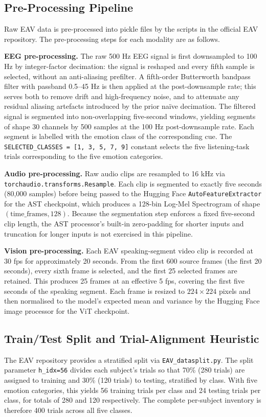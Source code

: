 \subsection{Pre-Processing Pipeline}
Raw EAV data is pre-processed into pickle files by the scripts in the official EAV repository. The pre-processing steps for each modality are as follows.

\textbf{EEG pre-processing.} The raw 500 Hz EEG signal is first downsampled to 100 Hz by integer-factor decimation: the signal is reshaped and every fifth sample is selected, without an anti-aliasing prefilter. A fifth-order Butterworth bandpass filter with passband 0.5--45 Hz is then applied at the post-downsample rate; this serves both to remove drift and high-frequency noise, and to attenuate any residual aliasing artefacts introduced by the prior naïve decimation. The filtered signal is segmented into non-overlapping five-second windows, yielding segments of shape 30 channels by 500 samples at the 100 Hz post-downsample rate. Each segment is labelled with the emotion class of the corresponding cue. The \texttt{SELECTED\_CLASSES = [1, 3, 5, 7, 9]} constant selects the five listening-task trials corresponding to the five emotion categories.

\textbf{Audio pre-processing.} Raw audio clips are resampled to 16 kHz via \texttt{torchaudio.transforms.Resample}. Each clip is segmented to exactly five seconds (80{,}000 samples) before being passed to the Hugging Face \texttt{AutoFeatureExtractor} for the AST checkpoint, which produces a 128-bin Log-Mel Spectrogram of shape $(\mathrm{time\_frames}, 128)$. Because the segmentation step enforces a fixed five-second clip length, the AST processor's built-in zero-padding for shorter inputs and truncation for longer inputs is not exercised in this pipeline.

\textbf{Vision pre-processing.} Each EAV speaking-segment video clip is recorded at 30 fps for approximately 20 seconds. From the first 600 source frames (the first 20 seconds), every sixth frame is selected, and the first 25 selected frames are retained. This produces 25 frames at an effective 5 fps, covering the first five seconds of the speaking segment. Each frame is resized to $224\times224$ pixels and then normalised to the model's expected mean and variance by the Hugging Face image processor for the ViT checkpoint.

\subsection{Train/Test Split and Trial-Alignment Heuristic}
The EAV repository provides a stratified split via \texttt{EAV\_datasplit.py}. The split parameter \texttt{h\_idx=56} divides each subject's trials so that 70\% (280 trials) are assigned to training and 30\% (120 trials) to testing, stratified by class. With five emotion categories, this yields 56 training trials per class and 24 testing trials per class, for totals of 280 and 120 respectively. The complete per-subject inventory is therefore 400 trials across all five classes.


